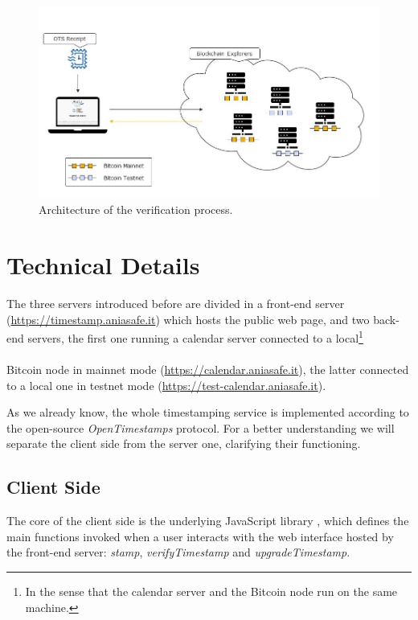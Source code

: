 \bigskip
\begin{figure}[!htb]
    \centering
	\includegraphics[width=1\linewidth]{Images/project-verifying.jpg}
	\caption{Architecture of the verification process.}
	\label{fig:ots-project-verifying}
\end{figure}

\bigskip
\section{Technical Details}
The three servers introduced before are divided in a front-end server (\url{https://timestamp.aniasafe.it}) which hosts the public web page, and two back-end servers, the first one running a calendar server connected to a local\footnote{In the sense that the calendar server and the Bitcoin node run on the same machine.}
\\ \\ 
Bitcoin node in mainnet mode (\url{https://calendar.aniasafe.it}), the latter connected to a local one in testnet mode (\url{https://test-calendar.aniasafe.it}).

\bigskip
\noindent
As we already know, the whole timestamping service is implemented according to the open-source \textit{OpenTimestamps} protocol. For a better understanding we will separate the client side from the server one, clarifying their functioning.

\bigskip
\subsection{Client Side}
\label{sec:client-side}
The core of the client side is the underlying JavaScript library \cite{LibraryRepositoryGitHub}, which defines the main functions invoked when a user interacts with the web interface hosted by the front-end server: \textit{stamp}, \textit{verifyTimestamp} and \textit{upgradeTimestamp}.

